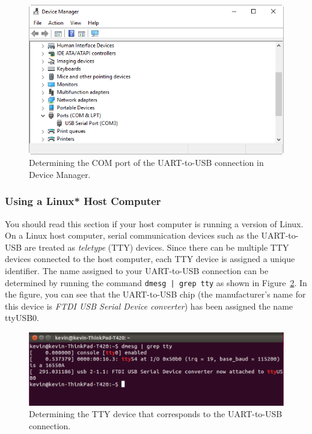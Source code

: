 \documentclass[11pt, twoside, pdftex]{article}
\begin{document}
\begin{figure}[H]
   \begin{center}
       \includegraphics[scale=0.7]{figures/fig_putty_tut_0}
   \end{center}
   \caption{Determining the COM port of the UART-to-USB connection in Device Manager.}
	\label{fig:putty_0}
\end{figure}

\subsubsection{Using a Linux* Host Computer}

You should read this section if your host computer is running a version of Linux.
On a Linux host computer, serial communication devices such as the UART-to-USB are treated 
as \textit{teletype} (TTY) devices. Since there can be multiple TTY devices connected to
the host computer, each TTY device is assigned a unique identifier. The name assigned to your 
UART-to-USB connection
can be determined by running the command \texttt{dmesg | grep tty} as shown in 
Figure~\ref{fig:dmesg}. In the figure, you can see that the UART-to-USB chip (the manufacturer's
name for this device is \textit{FTDI USB Serial Device converter}) has been assigned the name 
ttyUSB0.

\begin{figure}[H]
   \begin{center}
       \includegraphics[scale=0.5]{figures/new_tty.png}
   \end{center}
   \caption{Determining the TTY device that corresponds to the UART-to-USB connection.}
	\label{fig:dmesg}
\end{figure}
\end{document}
